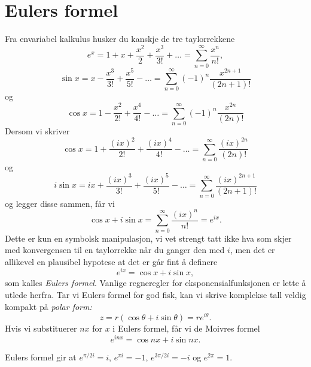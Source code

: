 \section*{Eulers formel}
Fra envariabel kalkulus husker du kanskje de tre taylorrekkene
\[
e^{x}=1+x+\frac{x^{2}}{2}+\frac{x^{3}}{3!}+\dots=\sum_{n=0}^{\infty}\frac{x^{n}}{n!}, 
\]
\[
\sin{x}=x-\frac{x^{3}}{3!}+\frac{x^{5}}{5!}-\dots=\sum_{n=0}^{\infty}(-1)^{n}\frac{x^{2n+1}}{(2n+1)!} 
\]
og
\[
\cos{x}=1-\frac{x^{2}}{2!}+\frac{x^{4}}{4!}-\dots=\sum_{n=0}^{\infty}(-1)^{n}\frac{x^{2n}}{(2n)!}
\]
Dersom vi skriver 
\[
\cos{x}=1+\frac{(ix)^{2}}{2!}+\frac{(ix)^{4}}{4!}-\dots=\sum_{n=0}^{\infty}\frac{(ix)^{2n}}{(2n)!}
\]
og 
\[
i\sin{x}=ix+\frac{(ix)^{3}}{3!}+\frac{(ix)^{5}}{5!}-\dots=\sum_{n=0}^{\infty}\frac{(ix)^{2n+1}}{(2n+1)!}
\]
og legger disse sammen, får vi 
\[
\cos x + i\sin x=\sum_{n=0}^{\infty}\frac{(ix)^{n}}{n!}=e^{ix}.
\]
Dette er kun en symbolsk manipulasjon, vi vet strengt tatt ikke hva som skjer med konvergensen til en taylorrekke når du ganger den med $i$, men det er allikevel en plausibel hypotese at det er går fint å definere
\[
e^{ix}=\cos x + i\sin x,
\]
som kalles \emph{Eulers formel}. Vanlige regneregler for eksponensialfunksjonen er lette å utlede herfra.
Tar vi Eulers formel for god fisk, kan vi skrive komplekse tall veldig kompakt på \emph{polar form:}
\[
z=r(\cos \theta+i\sin \theta)=re^{i\theta}.
\]
Hvis vi substituerer $nx$ for $x$ i Eulers formel, får vi de Moivres formel
\[
e^{inx}=\cos nx + i\sin nx.
\]

\begin{ex}
Eulers formel gir at $e^{\pi/2 i}=i$, $e^{\pi i}=-1$, $e^{3\pi/2 i}=-i$ og $e^{2\pi}=1$.
\end{ex}

